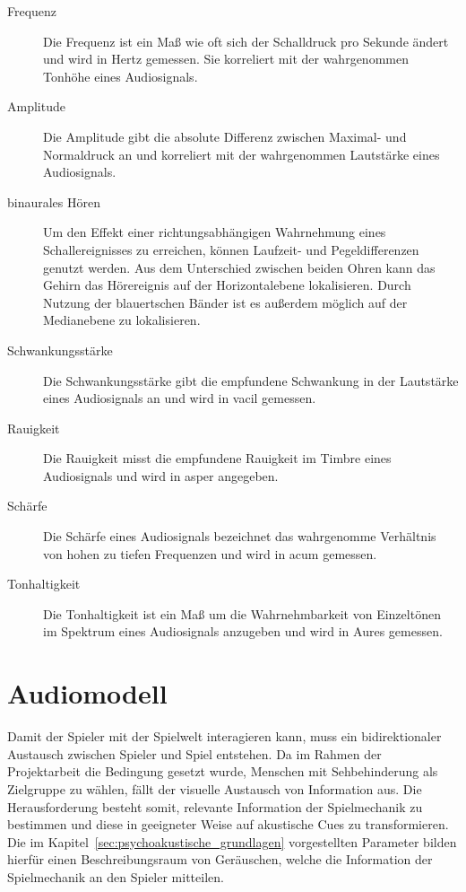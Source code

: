 \documentclass[a4paper, 11pt]{scrartcl}
\begin{document}
\begin{description}
	\item[Frequenz]	Die Frequenz ist ein Maß wie oft sich der Schalldruck pro
		Sekunde ändert und wird in Hertz gemessen. Sie korreliert mit der
		wahrgenommen Tonhöhe eines Audiosignals.
	\item[Amplitude]  Die Amplitude gibt die absolute Differenz zwischen
		Maximal- und Normaldruck an und korreliert mit der wahrgenommen
		Lautstärke eines Audiosignals.
	\item[binaurales Hören] Um den Effekt einer richtungsabhängigen Wahrnehmung
		eines Schallereignisses zu erreichen, können Laufzeit- und
		Pegeldifferenzen genutzt werden. Aus dem Unterschied zwischen beiden
		Ohren kann das Gehirn das Hörereignis auf der Horizontalebene
		lokalisieren. Durch Nutzung der blauertschen Bänder ist es außerdem
		möglich auf der Medianebene zu lokalisieren.
	\item[Schwankungsstärke] Die Schwankungsstärke gibt die empfundene
		Schwankung in der Lautstärke eines Audiosignals an und wird in vacil
		gemessen.
	\item[Rauigkeit] Die Rauigkeit misst die empfundene Rauigkeit im Timbre
		eines Audiosignals und wird in asper angegeben.
	\item[Schärfe] Die Schärfe eines Audiosignals bezeichnet das wahrgenomme
		Verhältnis von hohen zu tiefen Frequenzen und wird in acum gemessen.
	\item[Tonhaltigkeit] Die Tonhaltigkeit ist ein Maß um die Wahrnehmbarkeit
		von Einzeltönen im Spektrum eines Audiosignals anzugeben und wird in
		Aures gemessen.
\end{description}

\section{Audiomodell}
\label{sec:audiomodell}

Damit der Spieler mit der Spielwelt interagieren kann, muss ein bidirektionaler
Austausch zwischen Spieler und Spiel entstehen. Da im Rahmen der Projektarbeit
die Bedingung gesetzt wurde, Menschen mit Sehbehinderung als Zielgruppe zu
wählen, fällt der visuelle Austausch von Information aus. Die Herausforderung
besteht somit, relevante Information der Spielmechanik zu bestimmen und diese in
geeigneter Weise auf akustische Cues zu transformieren. Die im
Kapitel~\ref{sec:psychoakustische_grundlagen} vorgestellten Parameter bilden
hierfür einen Beschreibungsraum von Geräuschen, welche die Information der
Spielmechanik an den Spieler mitteilen.
\end{document}
